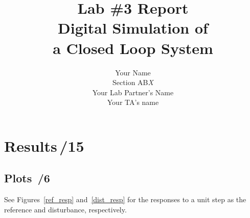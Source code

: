 \documentclass{article}
\newcommand{\score}{\hfill \underline{\hspace{0.65cm}}\,/} %
\begin{document}
\title{\bf Lab \#3 Report\\{\sc Digital Simulation of \\ a Closed Loop System}}
\author{Your Name\\ Section AB\emph{X}\\
Your Lab Partner's Name\\
Your TA's name}
\maketitle
\noindent {}
\section{{\sc Results}\score 15}
\subsection{Plots \score 6}
See Figures~\ref{ref_resp} and~\ref{dist_resp} for the responses to a unit step as the reference and disturbance, respectively.

\end{document}
